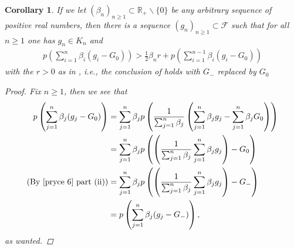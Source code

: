 \documentclass[10pt,twoside,openany,final]{memoir}
\theoremstyle{break}
\newtheorem{corollary}[section]{Corollary}
\theoremstyle{Break}
\newcommand{\R}{\mathbb{R}}
\begin{document}
\begin{corollary} \label{pryce corollary 2}
If we let $(\beta_{n})_{n\geq 1} \subset \R_{+} \backslash \{0\}$ be any arbitrary sequence of positive real numbers, then there is a sequence $(g_{n})_{n \geq 1} \subset \mathcal{F}$ such that for all $n \geq 1$ one has $g_{n} \in K_{n}$ and
\begin{align*}
p\left( \sum_{i=1}^n \beta_{i} (g_{i} - G_{0}) \right) > \frac12 \beta_{n} r + p\left(\sum_{i=1}^{n-1} \beta_{i}(g_{i}-G_{0}) \right)
\end{align*}
with the $r >0$ as in , i.e., the conclusion of   holds with $G_{-}$ replaced by $G_{0}$
\begin{proof}
Fix $n \geq 1$, then we see that
\begin{align*}
p\left( \sum_{j=1}^n \beta_{j}(g_{j}-G_{0}) \right)
&= \sum_{j=1}^n \beta_{j} p\left(\frac{1}{\sum_{j=1}^n \beta_{j}} \left(\sum_{j=1}^n \beta_{j}g_{j}-\sum_{j=1}^n \beta_{j} G_{0}\right)  \right)\\
&= \sum_{j=1}^n \beta_{j} p\left( \left(\frac{1}{\sum_{j=1}^n \beta_{j}} \sum_{j=1}^n \beta_{j} g_{j}\right) - G_{0}  \right)\\
\text{(By \Cref{pryce 6} part (ii))}&= \sum_{j=1}^n \beta_{j} p\left(\left( \frac{1}{\sum_{j=1}^n \beta_{j}} \sum_{j=1}^n \beta_{j} g_{j}\right)-G_{-}\right)\\
&=p\left( \sum_{j= 1}^n \beta_{j} (g_{j}-G_{-}) \right),
\end{align*}
as wanted.
\end{proof}
\end{corollary}
\end{document}
